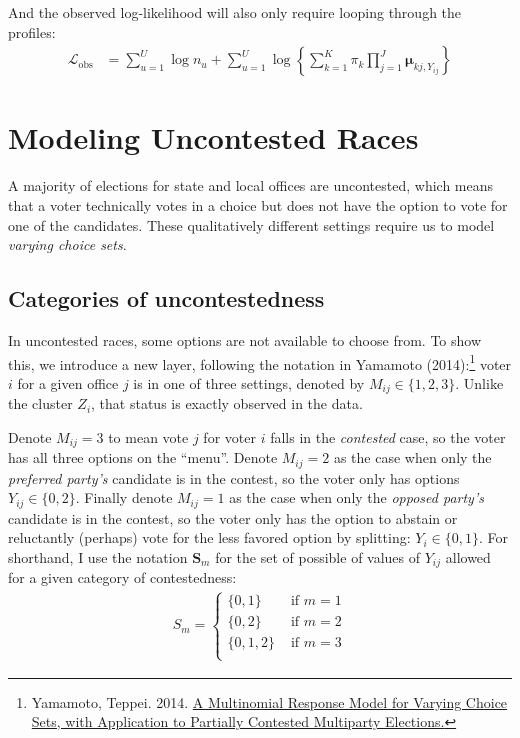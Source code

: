 \documentclass[11pt]{article}
\begin{document}
And the observed log-likelihood will also only require looping through the profiles:
\begin{align}
\mathcal{L}_{\text{obs}} &= \sum^{U}_{u=1}\log n_u + \sum^{U}_{u=1}\log\left\{\sum^{K}_{k=1}\pi_k \prod^{J}_{j=1}\bm{\mu}_{kj,Y_{ij}}\right\}
\end{align}



\section{Modeling Uncontested Races}

A majority of elections for state and local offices are uncontested, which means that a voter technically votes in a choice but does not have the option to vote for one of the candidates. These qualitatively different settings require us to model \emph{varying choice sets}.

\subsection{Categories of uncontestedness}

In uncontested races, some options are not available to choose from. To show this, we introduce a new layer, following the notation in Yamamoto (2014):\footnote{Yamamoto, Teppei. 2014. \href{http://web.mit.edu/teppei/www/research/dchoice.pdf}{A Multinomial Response Model for Varying Choice Sets, with Application to Partially Contested Multiparty Elections.}} voter \(i\) for a given office \(j\) is in one of three settings, denoted by \(M_{ij} \in \{1, 2, 3\}\). Unlike the cluster \(Z_i\), that status is exactly observed in the data.

Denote \(M_{ij} = 3\) to mean vote \(j\) for voter \(i\) falls in the \emph{contested} case, so the voter has all three options on the ``menu''. Denote \(M_{ij} = 2\) as the case when only the \emph{preferred party's} candidate is in the contest, so the voter only has options \(Y_{ij} \in \{0, 2\}\). Finally denote \(M_{ij} = 1\) as the case when only the \emph{opposed party's} candidate is in the contest, so the voter only has the option to abstain or reluctantly (perhaps) vote for the less favored option by splitting: \(Y_{i} \in \{0, 1\}\). For shorthand, I use the notation \(\bm{S}_{m}\) for the set of possible of values of \(Y_{ij}\) allowed for a given category of contestedness:
\begin{align*}
S_{m} = \begin{cases}
\{0, 1\} & \text{~if~} m = 1\\
\{0, 2\}  & \text{~if~} m = 2\\
\{0, 1, 2\} & \text{~if~} m = 3\\
\end{cases}
\end{align*}
\end{document}
